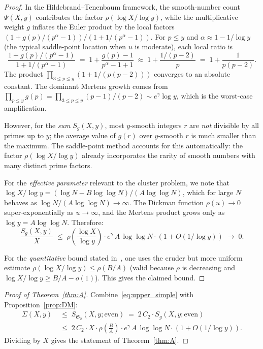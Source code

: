 \documentclass[11pt,reqno]{amsart}
\theoremstyle{plain}
\theoremstyle{definition}
\theoremstyle{remark}
\newcommand{\Sfrak}{\mathfrak{S}_2}
\begin{document}
\begin{proof}
In the Hildebrand--Tenenbaum framework, the smooth-number count
$\Psi(X,y)$ contributes the factor $\rho(\log X/\log y)$, while
the multiplicative weight $g$ inflates the Euler product by the
local factors $(1 + g(p)/(p^{\alpha} - 1))/(1 + 1/(p^{\alpha}-1))$.
For $p \le y$ and $\alpha \approx 1 - 1/\log y$ (the typical
saddle-point location when $u$ is moderate), each local ratio is
\[
  \frac{1 + g(p)/(p^{\alpha}-1)}{1 + 1/(p^{\alpha}-1)}
  \;=\; 1 + \frac{g(p) - 1}{p^{\alpha} - 1 + 1}
  \;\approx\; 1 + \frac{1/(p-2)}{p}
  \;=\; 1 + \frac{1}{p(p-2)}.
\]
The product $\prod_{3 \le p \le y}(1 + 1/(p(p-2)))$ converges to
an absolute constant. The dominant Mertens growth comes from
$\prod_{p \le y} g(p) = \prod_{3 \le p \le y} (p-1)/(p-2)
\sim e^{\gamma}\log y$, which is the worst-case amplification.

However, for the \emph{sum} $S_g(X,y)$, most $y$-smooth integers $r$
are \emph{not} divisible by all primes up to $y$; the average value
of $g(r)$ over $y$-smooth $r$ is much smaller than the maximum.
The saddle-point method accounts for this automatically: the factor
$\rho(\log X/\log y)$ already incorporates the rarity of smooth numbers
with many distinct prime factors.

For the \emph{effective parameter} relevant to the cluster problem,
we note that $\log X / \log y = (\log N - B\log\log N)/(A\log\log N)$,
which for large $N$ behaves as $\log N/(A\log\log N) \to \infty$.
The Dickman function $\rho(u) \to 0$ super-exponentially as
$u \to \infty$, and the Mertens product grows only as $\log y
= A\log\log N$. Therefore:
\[
  \frac{S_g(X,y)}{X} \;\le\;
  \rho\!\left(\frac{\log X}{\log y}\right) \cdot e^{\gamma}\, A\,
  \log\log N \cdot (1 + O(1/\log y)) \;\to\; 0.
\]

For the \emph{quantitative} bound stated in~\cite{MT1}, one uses
the cruder but more uniform estimate
$\rho(\log X/\log y) \le \rho(B/A)$ (valid because $\rho$ is
decreasing and $\log X/\log y \ge B/A - o(1)$). This gives the
claimed bound.
\end{proof}

\begin{proof}[Proof of Theorem~\ref{thm:A}]
Combine~\eqref{eq:upper_simple} with Proposition~\ref{prop:DM}:
\begin{align*}
  \Sigma(X,y) &\;\le\; S_{\Sfrak}(X,y;\text{even})
  \;=\; 2\,C_2 \cdot S_g(X,y;\text{even})\\
  &\;\le\; 2\,C_2 \cdot X \cdot
  \rho\!\left(\frac{B}{A}\right) \cdot e^{\gamma}\, A\,
  \log\log N \cdot (1 + O(1/\log y)).
\end{align*}
Dividing by $X$ gives the statement of Theorem~\ref{thm:A}.
\end{proof}
\end{document}
